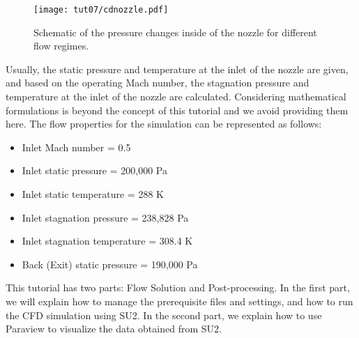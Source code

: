 \begin{figure}[H]
	\centering
	\texttt{[image: tut07/cdnozzle.pdf]}
	\caption{Schematic of the pressure changes inside of the nozzle for different flow regimes.}
	\label{fig7:cdnozzle}
\end{figure}
Usually, the static pressure and temperature at the inlet of the nozzle are given, and based on the operating Mach number, the stagnation pressure and temperature at the inlet of the nozzle are calculated. Considering mathematical formulations is beyond the concept of this tutorial and we avoid providing them here. The flow properties for the simulation can be represented as follows:
\begin{itemize}
	\item Inlet Mach number = 0.5
	\item Inlet static pressure = 200,000 Pa
	\item Inlet static temperature = 288 K
	\item Inlet stagnation pressure = 238,828 Pa
	\item Inlet stagnation temperature = 308.4 K
	\item Back (Exit) static pressure = 190,000 Pa
\end{itemize}
This tutorial has two parts: Flow Solution and Post-processing. In the first part, we will explain how to manage the prerequisite files and settings, and how to run the CFD simulation using SU2. In the second part, we explain how to use Paraview to visualize the data obtained from SU2.
